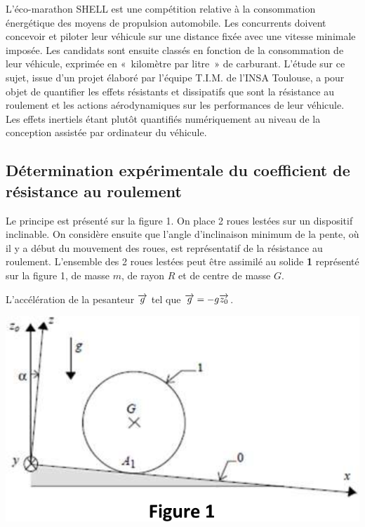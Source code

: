 \documentclass[10pt,fleqn]{article} %
\begin{document}
\def\pathfig{images}

\vspace{4.5cm}
\pagestyle{fancy}
\thispagestyle{plain}

\def\columnseprulecolor{\color{ocre}}
\setlength{\columnseprule}{0.4pt} 

\def\pathfig{images}

\ifprof
\else
\begin{multicols}{2}
\fi

\ifprof
\else
L’éco-marathon SHELL est une compétition relative à la consommation énergétique des moyens de propulsion automobile. Les concurrents doivent concevoir et piloter leur véhicule sur une distance fixée avec une vitesse minimale imposée.  Les candidats sont ensuite classés en fonction de la consommation de leur véhicule, exprimée en «~kilomètre par litre~» de carburant. L’étude sur ce sujet, issue d’un projet élaboré par l’équipe T.I.M. de l’INSA Toulouse, a pour objet de quantifier les effets résistants et dissipatifs que sont la résistance au roulement et les actions aérodynamiques sur les performances de leur véhicule. Les effets inertiels étant plutôt quantifiés numériquement au niveau de la conception assistée par ordinateur du véhicule. 
\fi

\subsection*{Détermination expérimentale du coefficient de résistance au roulement}

\ifprof
\else
Le principe est présenté sur la figure 1. On place 2 roues lestées sur un dispositif inclinable. On considère ensuite que l’angle d’inclinaison minimum de la pente, où il y a début du mouvement des roues, est représentatif de la résistance au roulement.  
L’ensemble des 2 roues lestées peut être assimilé au solide \textbf{1} représenté sur la figure 1, de masse $m$, de rayon $R$ et de centre de masse $G$. 

L'accélération de la pesanteur $\overrightarrow{g}$ tel que $\overrightarrow{g}=-g\overrightarrow{z_0}$. 


\begin{center}
\includegraphics[width=.95\linewidth]{images/fig_02}
\end{center}


\end{multicols}
\end{document}
